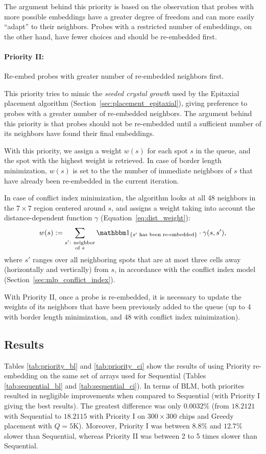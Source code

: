 The argument behind this priority is based on the observation that probes with
more possible embeddings have a greater degree of freedom and can more easily
``adapt'' to their neighbors. Probes with a restricted number of embeddings, on
the other hand, have fewer choices and should be re-embedded first.

\paragraph{Priority II:} Re-embed probes with greater number of re-embedded
neighbors first.

This priority tries to mimic the \emph{seeded crystal growth} used by the
Epitaxial placement algorithm (Section~\ref{sec:placement_epitaxial}), giving
preference to probes with a greater number of re-embedded neighbors. The
argument behind this priority is that probes should not be re-embedded until a
sufficient number of its neighbors have found their final embeddings.

With this priority, we assign a weight $w(s)$ for each spot $s$ in the queue,
and the spot with the highest weight is retrieved. In case of border length
minimization, $w(s)$ is set to the the number of immediate neighbors of $s$ that
have already been re-embedded in the current iteration.

In case of conflict index minimization, the algorithm looks at all 48 neighbors
in the $7\times 7$ region centered around $s$, and assigns a weight taking into
account the distance-dependent function $\gamma$
(Equation~\ref{eq:dist_weight}):
\[
w(s) := \sum_{\substack{s'\text{: neighbor}\\\text{of } s}}
        \Ind{s'\text{ has been re-embedded}}
        \cdot \gamma(s,s'),
\]
where $s'$ ranges over all neighboring spots that are at most three cells away
(horizontally and vertically) from $s$, in accordance with the conflict index
model (Section~\ref{sec:mlp_conflict_index}).

With Priority II, once a probe is re-embedded, it is necessary to update the
weights of its neighbors that have been previously added to the queue (up to 4
with border length minimization, and 48 with conflict index minimization).

\subsection{Results}

Tables \ref{tab:priority_bl} and \ref{tab:priority_ci} show the results of
using Priority re-embedding on the same set of arrays used for Sequential
(Tables \ref{tab:sequential_bl} and \ref{tab:sequential_ci}). In terms of BLM,
both priorites resulted in negligible improvements when compared to Sequential
(with Priority I giving the best results). The greatest difference was only
$0.0032\%$ (from $18.2121$ with Sequential to $18.2115$ with Priority I on
$300\times 300$ chips and Greedy placement with $Q=5$K). Moreover, Priority I
was between $8.8\%$ and $12.7\%$ slower than Sequential, whereas Priority II was
between 2 to 5 times slower than Sequential.

